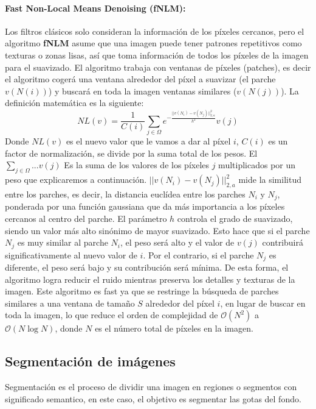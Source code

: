 \paragraph{Fast Non-Local Means Denoising (fNLM):} Los filtros clásicos solo consideran la información de los píxeles cercanos, pero el algoritmo \textbf{fNLM} \cite{ipol.2011.bcm_nlm} asume que una imagen puede tener patrones repetitivos como texturas o zonas lisas, así que toma información de todos los píxeles de la imagen para el suavizado. El algoritmo trabaja con ventanas de píxeles (patches), es decir el algoritmo cogerá una ventana alrededor del píxel a suavizar (el parche $v(N(i))$) y buscará en toda la imagen ventanas similares ($v(N(j))$). La definición matemática es la siguiente:
\begin{equation}
    NL(v) = \frac{1}{C(i)} \sum_{j \in \Omega} e^{-\frac{||v(N_i) - v(N_j)||^2_{2,a}}{h^2}} v(j)
\end{equation}
Donde $NL(v)$ es el nuevo valor que le vamos a dar al píxel $i$, $C(i)$ es un factor de normalización, se divide por la suma total de los pesos. El $\sum_{j \in \Omega} ... v(j)$ Es la suma de los valores de los píxeles $j$ multiplicados por un peso que explicaremos a continuación. $||v(N_i) - v(N_j)||^2_{2,a}$ mide la similitud entre los parches, es decir, la distancia euclídea entre los parches $N_i$ y $N_j$, ponderada por una función gaussiana que da más importancia a los píxeles cercanos al centro del parche. El parámetro $h$ controla el grado de suavizado, siendo un valor más alto sinónimo de mayor suavizado. Esto hace que si el parche $N_j$ es muy similar al parche $N_i$, el peso será alto y el valor de $v(j)$ contribuirá significativamente al nuevo valor de $i$. Por el contrario, si el parche $N_j$ es diferente, el peso será bajo y su contribución será mínima. De esta forma, el algoritmo logra reducir el ruido mientras preserva los detalles y texturas de la imagen. Este algoritmo es fast ya que se restringe la búsqueda de parches similares a una ventana de tamaño $S$ alrededor del píxel $i$, en lugar de buscar en toda la imagen, lo que reduce el orden de complejidad de  $\mathcal{O}(N^2)$ a $\mathcal{O}(N \log N)$, donde $N$ es el número total de píxeles en la imagen.


\subsection{Segmentación de imágenes}\label{subsec:segmentacion}

Segmentación es el proceso de dividir una imagen en regiones o segmentos con significado semantico, en este caso, el objetivo es segmentar las gotas del fondo.

